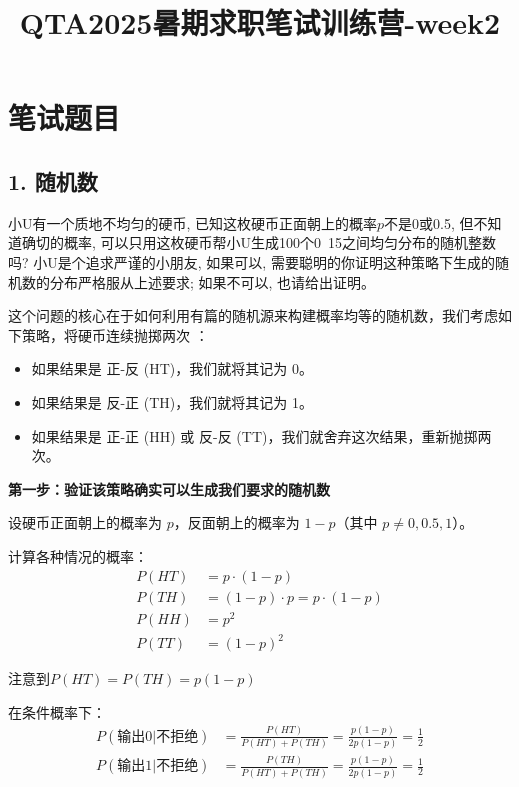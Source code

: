 \documentclass[UTF8]{ctexart}
\title{QTA2025暑期求职笔试训练营-week2}
\author{}
\date{}
\begin{document}
\maketitle

\section*{笔试题目}

\subsection*{1. 随机数}
小U有一个质地不均匀的硬币, 已知这枚硬币正面朝上的概率$p$不是0或0.5, 但不知道确切的概率, 可以只用这枚硬币帮小U生成100个0~15之间均匀分布的随机整数吗? 小U是个追求严谨的小朋友, 如果可以, 需要聪明的你证明这种策略下生成的随机数的分布严格服从上述要求; 如果不可以, 也请给出证明。

这个问题的核心在于如何利用有篇的随机源来构建概率均等的随机数，我们考虑如下策略，将硬币连续抛掷两次 ：
\begin{itemize}
    \item 如果结果是 正-反 (HT)，我们就将其记为 0。

    \item 如果结果是 反-正 (TH)，我们就将其记为 1。
    
    \item 如果结果是 正-正 (HH) 或 反-反 (TT)，我们就舍弃这次结果，重新抛掷两次。    
    
\end{itemize}

\textbf{第一步：验证该策略确实可以生成我们要求的随机数}

设硬币正面朝上的概率为 $p$，反面朝上的概率为 $1-p$（其中 $p \neq 0, 0.5, 1$）。

计算各种情况的概率：
\begin{align}
P(HT) &= p \cdot (1-p) \\
P(TH) &= (1-p) \cdot p = p \cdot (1-p) \\
P(HH) &= p^2 \\
P(TT) &= (1-p)^2
\end{align}

注意到$P(HT) = P(TH) = p(1-p)$

在条件概率下：
\begin{align}
P(\text{输出0} | \text{不拒绝}) &= \frac{P(HT)}{P(HT) + P(TH)} =
\frac{p(1-p)}{2p(1-p)} = \frac{1}{2} \\
P(\text{输出1} | \text{不拒绝}) &= \frac{P(TH)}{P(HT) + P(TH)} =
\frac{p(1-p)}{2p(1-p)} = \frac{1}{2}
\end{align}
\end{document}
